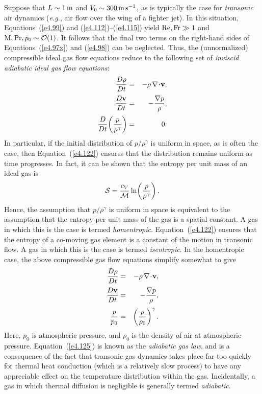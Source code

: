 Suppose that $L\sim 1\,{\rm m}$ and $V_0\sim 300\,{\rm m\,s^{-1}}$, as is typically the case for {\em transonic}\/
air dynamics ({\em e.g.}, air flow over the wing of a fighter jet). In this situation, 
Equations~(\ref{e4.99}) and (\ref{e4.112})--(\ref{e4.115}) yield ${\rm Re}, {\rm Fr} \gg 1$ and ${\rm M}, {\rm Pr}, \bar{p}_0\sim {\cal O}(1)$. It follows that  the final two terms  on the right-hand sides of Equations~(\ref{e4.97x}) and
(\ref{e4.98}) can be neglected. Thus, the (unnormalized) compressible ideal gas flow equations reduce to the
following set of {\em inviscid  adiabatic ideal gas flow equations}:
\begin{eqnarray}
\frac{D\rho}{Dt} &=& -\rho\,\nabla\!\cdot\!{\bf v},\\[0.5ex]
\frac{D{\bf v}}{Dt} &=& -\frac{\nabla p}{\rho},\\[0.5ex]
\frac{D}{Dt}\!\left(\frac{p}{\rho^\gamma}\right)&=&0. \label{e4.122}
\end{eqnarray}
In particular, if the initial distribution of $p/\rho^\gamma$ is  uniform in space, as is often the case, then Equation~(\ref{e4.122}) ensures that the distribution remains uniform as time progresses. In fact, it can be shown that the entropy
per unit mass of an ideal gas is
\begin{equation}
{\cal S} = \frac{c_V}{{\cal M}}\ln\!\left(\frac{p}{\rho^\gamma}\right).
\end{equation}
Hence, the assumption that $p/\rho^\gamma$ is uniform in space is equivalent to the assumption that the
entropy per unit mass of the gas is a spatial constant. A gas in which this is the case is termed {\em homentropic}. 
Equation~(\ref{e4.122}) ensures that the entropy of a co-moving gas element is a constant of the motion in
transonic flow. A gas in which this is the case is termed {\em isentropic}. 
In the homentropic case, the above compressible gas flow equations simplify
somewhat to give
\begin{eqnarray}
\frac{D\rho}{Dt} &=& -\rho\,\nabla\!\cdot\!{\bf v},\\[0.5ex]
\frac{D{\bf v}}{Dt} &=& -\frac{\nabla p}{\rho},\\[0.5ex]
\frac{p}{p_0} &=& \left(\frac{\rho}{\rho_0}\right)^\gamma.\label{e4.125}
\end{eqnarray}
Here, $p_0$ is atmospheric pressure, and $\rho_0$ is the density of air at atmospheric pressure. Equation~(\ref{e4.125})
is known as the {\em adiabatic gas law}, and is a consequence of the fact that transonic gas dynamics takes place
far too quickly for thermal heat conduction (which is a relatively slow process) to have any appreciable effect on the temperature distribution within the gas. Incidentally, a gas in which thermal diffusion is negligible is generally termed {\em adiabatic}.

